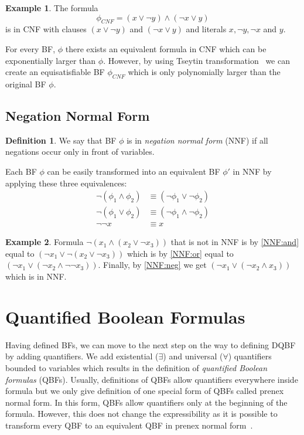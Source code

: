 \documentclass[
  digital, %
  color,
  twoside, %
  table,   %
  nolof,     %
  nolot,     %
]{fithesis3}
\theoremstyle{definition}
\newtheorem{definition}{Definition}
\newtheorem{example}{Example}
\theoremstyle{remark}
\begin{document}
\begin{example}
The formula
\[\phi_{CNF} = (x \lor \neg y) \land (\neg x \lor y)\]
is in CNF with clauses $(x \lor \neg y)$ and $(\neg x \lor y)$ and literals $x,\neg y, \neg x$ and $y$.
\end{example}

For every BF, $\phi$ there exists an equivalent formula in CNF which can be exponentially larger than $\phi$. However, by using Tseytin transformation~\cite{Tseitin} we can create an equisatisfiable BF $\phi_{CNF}$ which is only polynomially larger than the original BF $\phi$.

\subsection{Negation Normal Form}
\label{sec:BF:NNF}
\begin{definition}
  We say that BF $\phi$ is in \emph{negation normal form} (NNF) if all negations occur only in front of variables.
\end{definition}
Each BF $\phi$ can be easily transformed into an equivalent BF $\phi'$ in NNF by applying these three equivalences:
\begin{align}
    \neg(\phi_1 \land \phi_2) &\equiv (\neg\phi_1 \lor \neg\phi_2) \label{NNF:and} \\
    \neg(\phi_1 \lor \phi_2) &\equiv (\neg\phi_1 \land \neg\phi_2) \label{NNF:or}\\
    \neg\neg x &\equiv x \label{NNF:neg}
\end{align}
\begin{example}
Formula $\neg (x_1 \land (x_2 \lor \neg x_3))$ that is not in NNF is by \eqref{NNF:and} equal to $(\neg x_1 \lor \neg(x_2 \lor \neg x_3))$ which is by \eqref{NNF:or} equal to $(\neg x_1 \lor (\neg x_2 \land \neg\neg x_3))$. Finally, by \eqref{NNF:neg} we get $(\neg x_1 \lor (\neg x_2 \land x_3))$ which is in NNF.
\end{example}

\section{Quantified Boolean Formulas}
Having defined BFs, we can move to the next step on the way to defining DQBF by adding quantifiers. We add existential (${\exists}$) and universal (${\forall}$) quantifiers bounded to variables which results in the definition of \emph{quantified Boolean formulas} (QBFs). Usually, definitions of QBFs allow quantifiers everywhere inside formula but we only give definition of one special form of QBFs called prenex normal form. In this form, QBFs allow quantifiers only at the beginning of the formula. However, this does not change the expressibility as it is possible to transform every QBF to an equivalent QBF in prenex normal form~\cite{prenexingQBFs}.
\end{document}
